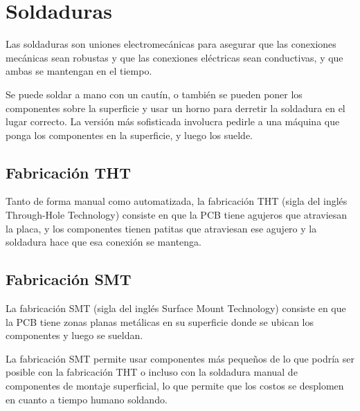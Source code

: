 \documentclass[../candidatura.tex]{subfiles}
\begin{document}
\section{Soldaduras}

\avisoesbozo

Las soldaduras son uniones electromecánicas para asegurar que las conexiones mecánicas sean robustas y que las conexiones eléctricas sean conductivas, y que ambas se mantengan en el tiempo.

Se puede soldar a mano con un cautín, o también se pueden poner los componentes sobre la superficie y usar un horno para derretir la soldadura en el lugar correcto. La versión más sofisticada involucra pedirle a una máquina que ponga los componentes en la superficie, y luego los suelde.







\subsection{Fabricación THT}

Tanto de forma manual como automatizada, la fabricación THT (sigla del inglés Through-Hole Technology) consiste en que la PCB tiene agujeros que atraviesan la placa, y los componentes tienen patitas que atraviesan ese agujero y la soldadura hace que esa conexión se mantenga.

\subsection{Fabricación SMT}

La fabricación SMT (sigla del inglés Surface Mount Technology) consiste en que la PCB tiene zonas planas metálicas en su superficie donde se ubican los componentes y luego se sueldan.

La fabricación SMT permite usar componentes más pequeños de lo que podría ser posible con la fabricación THT o incluso con la soldadura manual de componentes de montaje superficial, lo que permite que los costos se desplomen en cuanto a tiempo humano soldando.


\newpage
\end{document}
